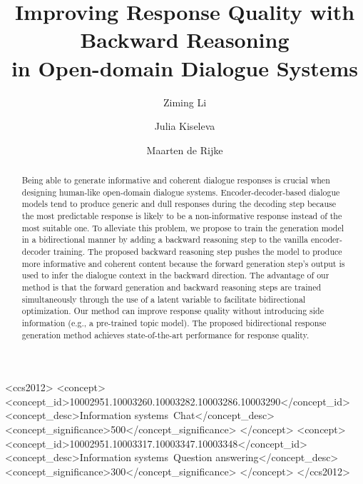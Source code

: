 \documentclass[sigconf]{acmart}
\begin{document}
\fancyhead{}
\title[Improving Response Quality with Backward Reasoning]{Improving Response Quality with Backward Reasoning\\ in Open-domain Dialogue Systems}

\author{Ziming Li}
\orcid{}

\author{Julia Kiseleva}
\orcid{}

\author{Maarten de Rijke}

\begin{abstract}
Being able to generate informative and coherent dialogue responses is crucial when designing human-like open-domain dialogue systems. Encoder-decoder-based dialogue models tend to produce generic and dull responses during the decoding step because the most predictable response is likely to be a non-informative response instead of the most suitable one. 
To alleviate this problem, we propose to train the generation model in a bidirectional manner by adding a backward reasoning step to the vanilla encoder-decoder training. The proposed backward reasoning step pushes the model to produce more informative and coherent content because the forward generation step's output is used to infer the dialogue context in the backward direction. The advantage of our method is that the forward generation and backward reasoning steps are trained simultaneously through the use of a latent variable to facilitate bidirectional optimization. Our method can improve response quality without introducing side information (e.g., a pre-trained topic model). 
The proposed bidirectional response generation method achieves state-of-the-art performance for response quality. 
\end{abstract}

\begin{CCSXML}
<ccs2012>
   <concept>
       <concept_id>10002951.10003260.10003282.10003286.10003290</concept_id>
       <concept_desc>Information systems~Chat</concept_desc>
       <concept_significance>500</concept_significance>
       </concept>
   <concept>
       <concept_id>10002951.10003317.10003347.10003348</concept_id>
       <concept_desc>Information systems~Question answering</concept_desc>
       <concept_significance>300</concept_significance>
       </concept>
 </ccs2012>
\end{CCSXML}
\end{document}
